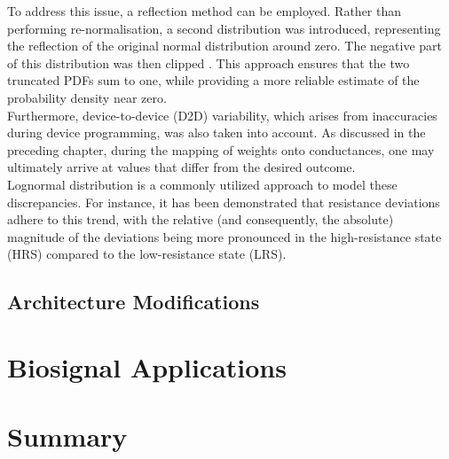 \noindent To address this issue, a reflection method can be employed. Rather than performing re-normalisation, a second distribution was introduced, representing the reflection of the original normal distribution around zero. The negative part of this distribution was then clipped \cite{jones1993simple}. This approach ensures that the two truncated PDFs sum to one, while providing a more reliable estimate of the probability density near zero.\\

\noindent Furthermore, device-to-device (D2D) variability, which arises from inaccuracies during device programming, was also taken into account. As discussed in the preceding chapter, during the mapping of weights onto conductances, one may ultimately arrive at values that differ from the desired outcome. \\

\noindent Lognormal distribution is a commonly utilized approach to model these discrepancies. For instance, it has been demonstrated that resistance deviations adhere to this trend, with the relative (and consequently, the absolute) magnitude of the deviations being more pronounced in the high-resistance state (HRS) compared to the low-resistance state (LRS).

\subsection{Architecture Modifications}

\section[Biosignal Applications]{Biosignal Applications}

\section[Summary]{Summary}